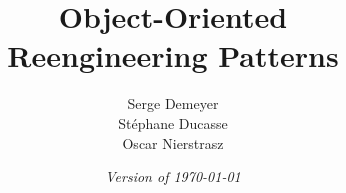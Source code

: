 \documentclass[a4paper,10pt,twoside]{book}
\begin{document}
\frontmatter
\setcounter{page}{1}
\pagestyle{headings}
\author{
	Serge Demeyer\\[1ex]
	St\'ephane Ducasse\\[1ex]
	Oscar Nierstrasz
}
\title{\Huge\bf Object-Oriented\\ Reengineering Patterns}
\isodate
\date{\emph{Version of \today}}
\maketitle
\cleardoublepage

\markboth{}{}
\newpage
~ %
\vfill
\end{document}
